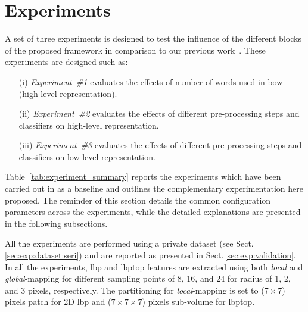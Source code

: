  \graphicspath{ {./content/experiment/figures/} }

\section{Experiments}
\label{sec:exp} 
A set of three experiments is designed to test the influence of the different blocks of the proposed framework in comparison to our previous work~\cite{Lemaintre2015miccaiOCT}.
These experiments are designed such as: 
\begin{enumerate}
\item[(i)] \emph{Experiment~\#1} evaluates the effects of number of words used in \ac{bow} (high-level representation).
\item[(ii)] \emph{Experiment~\#2} evaluates the effects of different pre-processing steps and classifiers on high-level representation.
\item[(iii)] \emph{Experiment~\#3} evaluates the effects of different pre-processing steps and classifiers on low-level representation.
\end{enumerate}
Table~\ref{tab:experiment_summary} reports the experiments which have been carried out in \cite{Lemaintre2015miccaiOCT} as a baseline and outlines the complementary experimentation here proposed.
The reminder of this section details the common configuration parameters across the experiments, while the detailed explanations are presented in the following 
subsections. 

All the experiments are performed using a private dataset (see Sect.\,\ref{sec:exp:dataset:seri}) and are reported as presented in Sect.\,\ref{sec:exp:validation}.
In all the experiments, \ac{lbp} and \ac{lbptop} features are extracted using both \emph{local} and \emph{global}-mapping for different sampling points of 8, 16, and 24 for radius of 1, 2, and 3 pixels, respectively.
The partitioning for \emph{local}-mapping is set to ($7 \times 7$) pixels patch for 2D \ac{lbp} and ($ 7 \times 7 \times 7$) pixels sub-volume for \ac{lbptop}.


